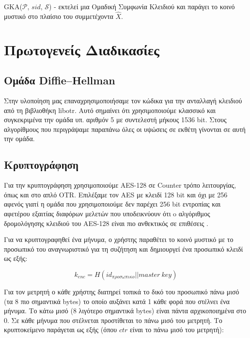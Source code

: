 \begin{algorithm}[p]
  \caption{GKA($\mathcal{P}$, $sid$, $\mathcal{S}$) - εκτελεί μια Ομαδική Συμφωνία Κλειδιού και παράγει το κοινό μυστικό στο πλαίσιο του συμμετέχοντα $\hat{X}$.}
  \label{gka_proto_algo_greek}
  
\end{algorithm}

\section{Πρωτογενείς Διαδικασίες}

\subsection{Ομάδα Diffie--Hellman}

Στην υλοποίηση μας επαναχρησιμοποιήσαμε τον κώδικα για την ανταλλαγή κλειδιού \dhname από τη βιβλιοθήκη libotr.
Αυτό σημαίνει ότι χρησιμοποιούμε κλασσικό \dhname και συγκεκριμένα την ομάδα υπ. αριθμόν 5 με συντελεστή μήκους 1536 bit.
Στους αλγορίθμους που περιγράψαμε παραπάνω όλες οι υψώσεις σε εκθέτη γίνονται σε αυτή την ομάδα.

\subsection{Κρυπτογράφηση}

Για την κρυπτογράφηση χρησιμοποιούμε AES-128 σε Counter τρόπο λειτουργίας, όπως και στο απλό OTR.
Επιλέξαμε τον AES με κλειδί 128 bit και όχι με 256 αφενός γιατί η ομάδα \dhname που χρησιμοποιούμε δεν παρέχει 256 bit εντροπίας και αφετέρου εξαιτίας διαφόρων μελετών που υποδεικνύουν ότι o αλγόριθμος δρομολόγησης κλειδιού του AES-128 είναι πιο ανθεκτικός σε επιθέσεις \cite{aes-key-recov} \cite{rijndael-improved-analysis}.

Για να κρυπτογραφηθεί ένα μήνυμα, ο χρήστης παραθέτει το κοινό μυστικό με το προσωπικό του αναγνωριστικό για τη συζήτηση και δημιουργεί ένα προσωπικό κλειδί ως εξής:

\[
k_{enc} = H(id_{προσωπικο} || master\ key)
\]

Για τον μετρητή ο κάθε χρήστης διατηρεί τοπικά το δικό του προσωπικό πάνω μισό (τα 8 πιο σημαντικά bytes) το οποίο αυξάνει κατά 1 κάθε φορά που στέλνει ένα μήνυμα.
Το κάτω μισό (8 λιγότερο σημαντικά bytes) είναι πάντα αρχικοποιημένα στο 0.
Σε κάθε μήνυμα που στέλνεται προστίθεται το πάνω μισό του μετρητή.
Το κρυπτοκείμενο παράγεται ως εξής (όπου $ctr$ είναι το πάνω μισό του μετρητή):

